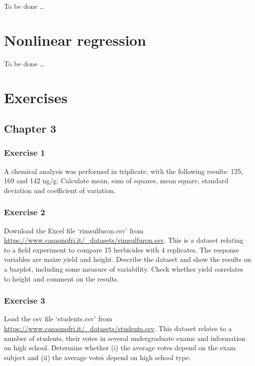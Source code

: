 \documentclass[a4paper,12pt,oneside]{book}
\begin{document}
To be done \ldots{}

\hypertarget{nonlinear-regression}{%
\chapter{Nonlinear regression}\label{nonlinear-regression}}

To be done \ldots{}

\hypertarget{exercises}{%
\chapter{Exercises}\label{exercises}}

\hypertarget{chapter-3}{%
\section{Chapter 3}\label{chapter-3}}

\hypertarget{exercise-1}{%
\subsection{Exercise 1}\label{exercise-1}}

A chemical analysis was performed in triplicate, with the following results: 125, 169 and 142 ng/g. Calculate mean, sum of squares, mean square, standard deviation and coefficient of variation.

\hypertarget{exercise-2}{%
\subsection{Exercise 2}\label{exercise-2}}

Download the Excel file `rimsulfuron.csv' from \url{https://www.casaonofri.it/_datasets/rimsulfuron.csv}. This is a dataset relating to a field experiment to compare 15 herbicides with 4 replicates. The response variables are maize yield and height. Describe the dataset and show the results on a barplot, including some measure of variability. Check whether yield correlates to height and comment on the results.

\hypertarget{exercise-3}{%
\subsection{Exercise 3}\label{exercise-3}}

Load the csv file `students.csv' from \url{https://www.casaonofri.it/_datasets/students.csv}. This dataset relates to a number of students, their votes in several undergraduate exams and information on high school. Determine whether (i) the average votes depend on the exam subject and (ii) the average votes depend on high school type.
\end{document}
